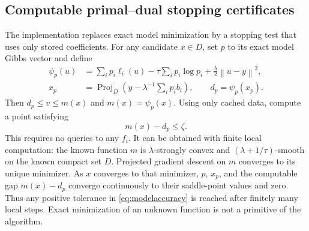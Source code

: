 \documentclass[11pt,a4paper]{article}
\theoremstyle{definition}\newtheorem{definition}[theorem]{Definition}
\theoremstyle{remark}\newtheorem{remark}[theorem]{Remark}
\newcommand{\norm}[1]{\left\|#1\right\|}
\DeclareMathOperator{\proj}{Proj}
\begin{document}
\subsection{Computable primal--dual stopping certificates}\label{sec:finite-model}
The implementation replaces exact model minimization by a stopping test
that uses only stored coefficients. For any candidate $x\in D$, set $p$ to its exact model Gibbs vector and define
\begin{align}
 \psi_p(u)&=\sum_i p_i\ell_i(u)-\tau\sum_i p_i\log p_i
                +\frac\lambda2\norm{u-y}^2,\label{eq:psip}\\
 x_p&=\proj_D\left(y-\lambda^{-1}\sum_i p_i b_i\right),\qquad
 d_p=\psi_p(x_p).\label{eq:dualcertificate}
\end{align}
Then $d_p\le v\le m(x)$ and $m(x)=\psi_p(x)$. Using only cached data, compute a point satisfying
\begin{equation}\label{eq:modelaccuracy}
 m(x)-d_p\le\zeta.
\end{equation}
This requires no queries to any $f_i$. It can be obtained with finite local computation: the known function $m$ is $\lambda$-strongly convex and $(\lambda+1/\tau)$-smooth on the known compact set $D$. Projected gradient descent on $m$ converges to its unique minimizer. As $x$ converges to that minimizer, $p$, $x_p$, and the computable gap $m(x)-d_p$ converge continuously to their saddle-point values and zero. Thus any positive tolerance in \eqref{eq:modelaccuracy} is reached after finitely many local steps. Exact minimization of an unknown function is not a primitive of the algorithm.
\end{document}
